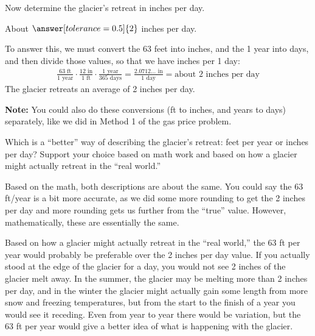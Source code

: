 \documentclass[12pt]{ximera}
\begin{document}
\begin{problem}
Now determine the glacier's retreat in inches per day.

About $\answer[tolerance=0.5]{2}$ inches per day.

\begin{solution}
To answer this, we must convert the 63 feet into inches, and the 1 year into days, and
then divide those values, so that we have inches per 1 day:
\begin{gather*}
\frac{63\text{ ft}}{1\text{ year}} \cdot \frac{12\text{ in}}{1\text{ ft}} \cdot \frac{1\text{ year}}{365\text{ days}}
= \frac{2.0712\ldots\text{ in}}{1\text{ day}} = \text{about 2 inches per day}
\end{gather*}
The glacier retreats an average of 2 inches per day.

\textbf{Note:} You could also do these conversions (ft to inches, and years to days)
separately, like we did in Method 1 of the gas price problem.
\end{solution}
\end{problem}

\begin{problem}
Which is a ``better'' way of describing the glacier's retreat: feet per year or inches
per day? Support your choice based on math work and based on how a glacier might
actually retreat in the ``real world.''

\begin{freeResponse}
\end{freeResponse}

\begin{solution}
Based on the math, both descriptions are about the same. You could say the 63 ft/year is
a bit more accurate, as we did some more rounding to get the 2 inches per day and more
rounding gets us further from the ``true'' value. However, mathematically, these are
essentially the same.

Based on how a glacier might actually retreat in the ``real world,'' the 63 ft per year
would probably be preferable over the 2 inches per day value. If you actually stood at
the edge of the glacier for a day, you would not see 2 inches of the glacier melt away.
In the summer, the glacier may be melting more than 2 inches per day, and in the winter
the glacier might actually gain some length from more snow and freezing temperatures,
but from the start to the finish of a year you would see it receding. Even from year to
year there would be variation, but the 63 ft per year would give a better idea of what
is happening with the glacier.
\end{solution}
\end{problem}
\end{document}
